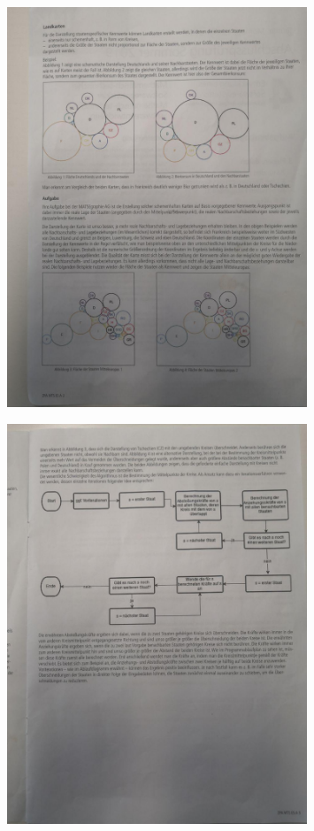 \begin{figure}[htb]
    \centering
    \includegraphics[width=0.8\textwidth,]{./aufgabenstellung/2.jpg}
\end{figure}

\begin{figure}[htb]
    \centering
    \includegraphics[width=0.8\textwidth,]{./aufgabenstellung/3.jpg}
\end{figure}

